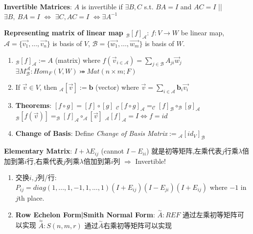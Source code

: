 \documentclass[9pt]{article}
\begin{document}
\textbf{Invertible Matrices}: {\small $A$ is invertible if $\exists B,C$ s.t. $BA=I$ and $AC=I$ \quad || \quad $\exists B, \ BA=I$ $\Leftrightarrow$ $\exists C,AC=I$ $\Leftrightarrow \exists A^{-1}$} 

\textbf{Representing matrix of linear map $_{\mathcal{B}}[f]_{\mathcal{A}}$}: $f:V\to W$ be linear map, $\mathcal{A}=\{\vec{v_1},...,\vec{v_n}\}$ is basis of $V$, $\mathcal{B}=\{\vec{w_1},...,\vec{w_m}\}$ is basis of $W$.

\begin{enumerate}[itemsep=-2pt, topsep=-2pt]
    \item $_{\mathcal{B}}[f]_{\mathcal{A}}:=A$ {\small (matrix)} where $f(\vec{v}_{i\in\mathcal{A}})=\sum_{j\in\mathcal{B}}A_{ji}\vec{w}_j$ \quad \quad $\exists M^{\mathcal{A}}_{\mathcal{B}}:Hom_{F}(V,W)\bij Mat(n\times m;F)$
    \item If $\vec{v}\in V$, then $_{\mathcal{A}}[\vec{v}]:=\mathbf{b}$ {\small (vector)} where $\vec{v}=\sum_{i\in\mathcal{A}}\mathbf{b}_i\vec{v_i}$
    \item \textbf{Theorems}: $[f\circ g]=[f]\circ[g]$ \quad \quad $_{\mathcal{C}}[f\circ g]_{\mathcal{A}}=_{\mathcal{C}}[f]_{\mathcal{B}}\circ_{\mathcal{B}}[g]_{\mathcal{A}}$ \quad \quad $_{\mathcal{B}}[f(\vec{v})]=_{\mathcal{B}}[f]_{\mathcal{A}}\circ_{\mathcal{A}}[\vec{v}]$ \quad \quad $_{\mathcal{A}}[f]_{\mathcal{A}}=I\Leftrightarrow f=id$
    \item \textbf{Change of Basis}: {\small Define \textit{Change of Basis Matrix}$:=$$_{\mathcal{A}}[id_V]_{\mathcal{B}}$ \quad {}}
\end{enumerate}

\textbf{Elementary Matrix}: $I+\lambda E_{ij}$ {\scriptsize (cannot $I-E_{ii}$)} {\footnotesize 就是初等矩阵,左乘代表$j$行乘$\lambda$倍加到第$i$行,右乘代表$j$列乘$\lambda$倍加到第$i$列} \quad $\Rightarrow$ \quad Invertible!

\begin{enumerate}[itemsep=-2pt, topsep=-2pt]
    \item {\footnotesize 交换$i,j$列/行}: $P_{ij}=diag(1,...,1,-1,1,...,1)(I+E_{ij})(I-E_{ji})(I+E_{ij})$ where $-1$ in $j$th place.
    \vspace{-2pt}
    \item \textbf{Row Echelon Form|Smith Normal Form}: $\stackrel{\sim}{A}:REF$ {\footnotesize 通过左乘初等矩阵可以实现} \quad \quad $\stackrel{\approx}{A}:S(n,m,r)$ {\footnotesize 通过$\stackrel{\sim}{A}$右乘初等矩阵可以实现}
\end{enumerate}
\end{document}
